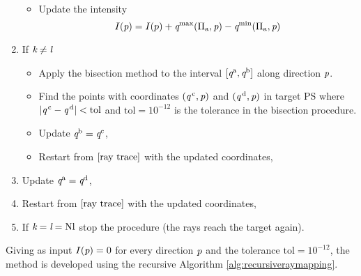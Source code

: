 \begin{enumerate}
\begin{itemize}
\begin{equation*}
\begin{aligned}
\end{aligned}
\end{equation*}
\item Update the intensity $$I(\textit{p}) = I(p)+\textit{q}^{\textrm{max}}(\Pi_{\textrm{a}}, \textit{p})-\textit{q}^{\textrm{min}}(\Pi_{\textrm{a}}, \textit{p})$$
\end{itemize}
\item If $\textit{k}\neq\textit{l}$ 
\begin{itemize}
\item Apply the bisection method to the interval $[\textit{q}^{\textrm{a}}, \textit{q}^{\textrm{b}}]$ along direction $\textit{p}$.
\item Find the points with coordinates $(\textit{q}^{\,\textrm{c}}, \textit{p})$ and $(\textit{q}^{\,\textrm{d}}, \textit{p})$ in target PS  where $|\textit{q}^{\,\textrm{c}}-\textit{q}^{\,\textrm{d}}|<\textrm{tol}$ and $\textrm{tol}=10^{-12}$ is the tolerance in the bisection procedure. 
\item Update $\textit{q}^{\textrm{b}} = \textit{q}^{\textrm{c}}$,
\item Restart from $\ref{ray trace}$ with the updated coordinates,
\end{itemize}
\item Update $\textit{q}^{\textrm{a}} = \textit{q}^{\textrm{d}}$,
\item Restart from $\ref{ray trace}$ with the updated coordinates, 
\item If $\textit{k}=\textit{l}= \textrm{Nl}$ stop the procedure (the rays reach the target again).
\end{enumerate}
Giving as input $I(\textit{p})=0$ for every direction $\textit{p}$ and the tolerance $\textrm{tol}=10^{-12}$,
the method is developed using the recursive Algorithm \ref{alg:recursiveraymapping}.
